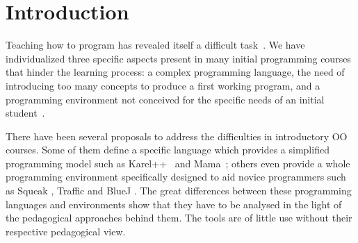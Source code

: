 \section{Introduction}
\label{sec:intro}

Teaching how to program has revealed itself a difficult task~\cite{dijkstra_89a, jenkins2002difficulty}.
We have individualized three specific aspects present in many initial programming courses that hinder  the learning process: 
a complex programming language,
the need of introducing too many concepts to produce a first working program, and
a programming environment not conceived for the specific needs of an initial student~\cite{singh2012}.

\medskip 



There have been several proposals to address the difficulties in introductory OO courses. Some of them define a specific language which provides a simplified programming model such as Karel++~\cite{bergin_karel++:_1996} and Mama~\cite{harrisonmama}; others even provide a whole programming environment specifically designed to aid novice programmers 
such as Squeak \cite{ingalls_back_1997}, Traffic \cite{broy_outside-method_2003} and BlueJ \cite{bennedsen_bluej_2010}. 
The great differences between these programming languages and environments show that they have to be analysed in the light of the pedagogical approaches behind them.
The tools are of little use without their respective pedagogical view.

